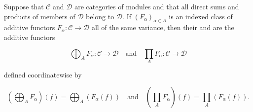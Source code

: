 Suppose that $\mathcal{C}$ and $\mathcal{D}$ are categories of modules and that all direct sums and products of members of $\mathcal{D}$ belong to $\mathcal{D}$. If $(F_\alpha)_{\alpha \in A}$ is an indexed class of additive functors $F_\alpha: \mathcal{C} \to \mathcal{D}$ all of the same variance, then their  and  are the additive functors

$$\bigoplus_A F_\alpha: \mathcal{C} \to \mathcal{D} \quad \text{and} \quad \prod_A F_\alpha: \mathcal{C} \to \mathcal{D}$$

defined coordinatewise by

$$\left(\bigoplus_A F_\alpha\right)(f) = \bigoplus_A (F_\alpha(f)) \quad \text{and} \quad \left(\prod_A F_\alpha\right)(f) = \prod_A (F_\alpha(f)).$$
